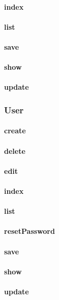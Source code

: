 \documentclass[12pt]{article}
\begin{document}
\paragraph{index}
\paragraph{list}
\paragraph{save}
\paragraph{show}
\paragraph{update}

\subsubsection{User}\label{sec:CUser}
\paragraph{create}
\paragraph{delete}
\paragraph{edit}
\paragraph{index}
\paragraph{list}
\paragraph{resetPassword}
\paragraph{save}
\paragraph{show}
\paragraph{update}
\end{document}
